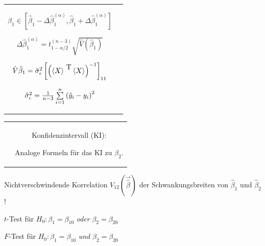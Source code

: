 \documentclass[a4paper]{foils}
\newcommand{\m}[1]{\left< #1 \right>}
\begin{document}
\begin{landscape}
\begin{center}
\begin{tabular}{cc}
{{\small 
$\beta_1\in [\hat{\beta}_1-\Delta \hat{\beta}_1^{(\alpha)},
 \hat{\beta}_1+\Delta \hat{\beta}_1^{(\alpha)}]$

$\Delta \hat{\beta}_1^{(\alpha)}=t_{1-\alpha/2}^{(n-3)}
\sqrt{\hat{V}(\hat{\beta}_1)}$

$\hat{V}\hat{\beta}_1
  =\hatsigeps^2\left[\left(\m{X}\tr\m{X}\right)^{-1}\right]_{11}$

$\hat{\sigma}_{\epsilon}^2=\frac{1}{n-3}\sum\limits_{i=1}^n
 \left(\hat{y}_i-y_i\right)^2$
}
}
\end{tabular}


\newpage
\vspace{0em}
\begin{tabular}{cc}
\parbox{0.7\textwidth}{
\vspace{-5em}
}
&
\parbox{0.6\textwidth}{Konfidenzintervall (KI):

Analoge Formeln f\"ur das KI zu $\beta_2$.
}
\end{tabular}

\newpage
 \vspace{-2em}

\vspace{-2em}

\parbox{1.2\textwidth}{\bi
\item Nichtverschwindende Korrelation $V_{12}(\vec{\hat{\beta}})$ 
der Schwankungsbreiten von  $\hat{\beta}_1$ und 
$\hat{\beta}_2$! \\[-2em]
\item 
$t$-Test f\"ur $H_0: \beta_1=\beta_{10}$ 
\textit{oder} $\beta_2=\beta_{20}$\\[-2em]
\item
$F$-Test f\"ur $H_0: \beta_1=\beta_{10}$ 
\textit{und} $\beta_2=\beta_{20}$
\ei
}

\newpage
 \vspace{0em}


\end{center}
\end{landscape}
\end{document}
